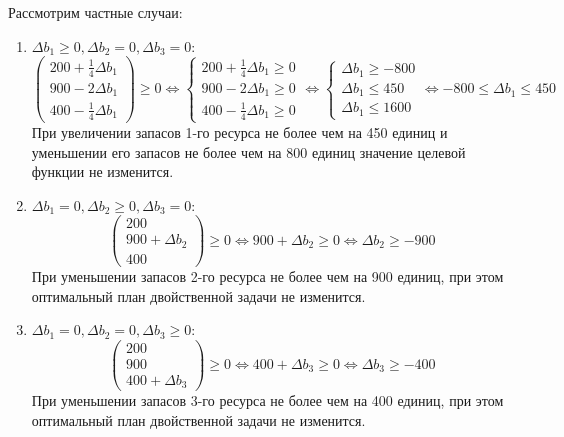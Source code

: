 \documentclass{article}
\begin{document}
\newpage
Рассмотрим частные случаи:
\begin{enumerate}
    \item $\Delta b_1 \geq 0, \Delta b_2 = 0, \Delta b_3 = 0$:
          \[
              \begin{pmatrix}
                  200 + \frac{1}{4} \Delta b_1 \\
                  900 - 2 \Delta b_1           \\
                  400 - \frac{1}{4} \Delta b_1
              \end{pmatrix} \geq 0 \Leftrightarrow \begin{cases}
                  200 + \frac{1}{4} \Delta b_1 \geq 0 \\
                  900 - 2 \Delta b_1 \geq 0           \\
                  400 - \frac{1}{4} \Delta b_1 \geq 0
              \end{cases} \Leftrightarrow \begin{cases}
                  \Delta b_1 \geq -800 \\
                  \Delta b_1 \leq 450  \\
                  \Delta b_1 \leq 1600
              \end{cases} \Leftrightarrow -800 \leq \Delta b_1 \leq 450
          \]
          При увеличении запасов 1-го ресурса не более чем на 450 единиц и уменьшении его запасов не более чем на 800 единиц значение целевой функции не изменится.
    \item $\Delta b_1 = 0, \Delta b_2 \geq 0, \Delta b_3 = 0$:
          \[
              \begin{pmatrix}
                  200              \\
                  900 + \Delta b_2 \\
                  400
              \end{pmatrix} \geq 0
              \Leftrightarrow 900 + \Delta b_2 \geq 0 \Leftrightarrow \Delta b_2 \geq -900
          \]
          При уменьшении запасов 2-го ресурса не более чем на 900 единиц, при этом оптимальный план двойственной задачи не изменится.
    \item $\Delta b_1 = 0, \Delta b_2 = 0, \Delta b_3 \geq 0$:
          \[
              \begin{pmatrix}
                  200 \\
                  900 \\
                  400 + \Delta b_3
              \end{pmatrix} \geq 0
              \Leftrightarrow 400 + \Delta b_3 \geq 0 \Leftrightarrow \Delta b_3 \geq -400
          \]
          При уменьшении запасов 3-го ресурса не более чем на 400 единиц, при этом оптимальный план двойственной задачи не изменится.
\end{enumerate}
\end{document}

